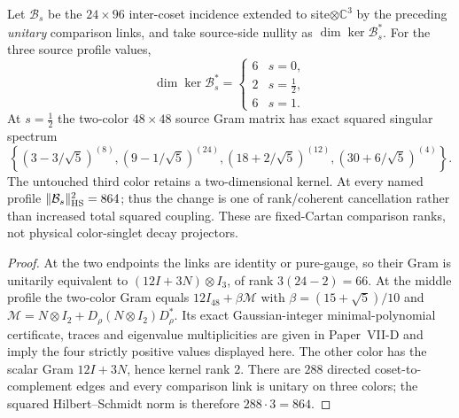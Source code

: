 \documentclass[12pt,a4paper]{article}
\begin{document}
\begin{theorem}
\label{p10:thm:v3027-cartan-dark-rank}
Let $\mathcal B_s$ be the $24\times96$ inter-coset incidence
extended to site$\otimes\mathbb C^3$ by the preceding \emph{unitary}
comparison links, and take source-side nullity as
$\dim\ker\mathcal B_s^*$. For the three source profile values,
\[
\boxed{\dim\ker\mathcal B_s^*=
  \begin{cases}6&s=0,\\2&s=\tfrac12,\\6&s=1.\end{cases}}
\]
At $s=\tfrac12$ the two-color $48\times48$ source Gram matrix has
exact squared singular spectrum
\[
\boxed{\left\{
 (3-3/\sqrt5)^{(8)},
 (9-1/\sqrt5)^{(24)},
 (18+2/\sqrt5)^{(12)},
 (30+6/\sqrt5)^{(4)}\right\}.}
\]
The untouched third color retains a two-dimensional kernel.
At every named profile $\|\mathcal B_s\|_{\rm HS}^2=864$;
thus the change is one of rank/coherent cancellation rather than
increased total squared coupling. These are fixed-Cartan comparison
ranks, not physical color-singlet decay projectors.
\end{theorem}
\begin{proof}
At the two endpoints the links are identity or pure-gauge, so their
Gram is unitarily equivalent to
$(12I+3N)\otimes I_3$, of rank $3(24-2)=66$.
At the middle profile the two-color Gram equals
$12I_{48}+\beta\mathscr M$ with
$\beta=(15+\sqrt5)/10$ and
$\mathscr M=N\otimes I_2+D_\rho(N\otimes I_2)D_\rho^*$.
Its exact Gaussian-integer minimal-polynomial certificate,
traces and eigenvalue multiplicities are given in Paper~VII-D
and imply the four strictly positive values displayed here.
The other color has the scalar Gram $12I+3N$, hence kernel rank $2$.
There are $288$ directed coset-to-complement edges and every
comparison link is unitary on three colors; the squared
Hilbert--Schmidt norm is therefore $288\cdot3=864$.
\end{proof}
\end{document}
